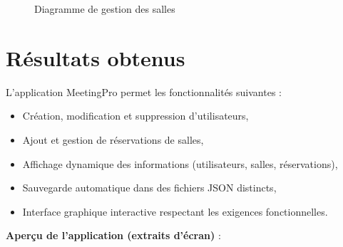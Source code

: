 \documentclass[a4paper,12pt]{article}
\begin{document}
\begin{figure}[H]
    \caption{Diagramme de gestion des salles}
    \label{fig:rooms}
\end{figure}

\section{Résultats obtenus}

L’application MeetingPro permet les fonctionnalités suivantes :
\begin{itemize}
    \item Création, modification et suppression d’utilisateurs,
    \item Ajout et gestion de réservations de salles,
    \item Affichage dynamique des informations (utilisateurs, salles, réservations),
    \item Sauvegarde automatique dans des fichiers JSON distincts,
    \item Interface graphique interactive respectant les exigences fonctionnelles.
\end{itemize}

\vspace{1cm}
\textbf{Aperçu de l’application (extraits d’écran)} :
\end{document}
